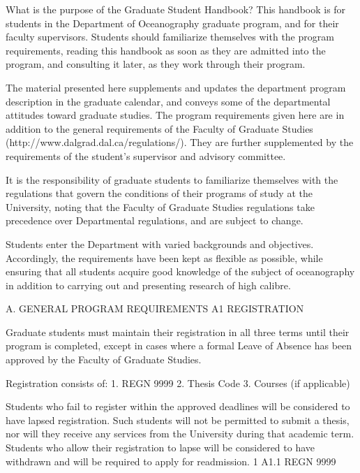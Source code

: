 
 
















What is the purpose of the Graduate Student   Handbook?
This handbook is for students in the Department of Oceanography graduate program, and for their faculty supervisors. Students should familiarize themselves with the program requirements, reading this handbook as soon as they are admitted into the program, and consulting it later, as they work through their program.

The material presented here supplements and updates the department program description in the  graduate calendar, and conveys some of the departmental attitudes toward graduate studies.  The program requirements given here are in addition to the general requirements of the Faculty of Graduate Studies (http://www.dalgrad.dal.ca/regulations/). They are further supplemented by the requirements of the student's supervisor and advisory committee.

It is the responsibility of graduate students to familiarize themselves with the regulations that govern the conditions of their programs of study at the University, noting that the Faculty of Graduate Studies regulations take precedence over Departmental regulations, and are subject to change.

Students enter the Department with varied backgrounds and objectives. Accordingly, the requirements have been kept as flexible as possible, while ensuring that all students acquire good knowledge of the subject of oceanography in addition to carrying out and presenting research of high calibre.
 



A.	GENERAL  PROGRAM REQUIREMENTS
A1	REGISTRATION

Graduate students must maintain their registration in all three terms until their program is completed, except in cases where a formal Leave of Absence has been approved by the Faculty of Graduate Studies.

Registration consists of:
1.	REGN 9999
2.	Thesis Code
3.	Courses (if applicable)

Students who fail to register within the approved deadlines will be considered to have lapsed registration. Such students will not be permitted to submit a thesis, nor will they receive any services from the University during that academic term. Students who allow their registration to lapse will be considered to have withdrawn and will be required to apply for readmission. 1
A1.1	REGN 9999

